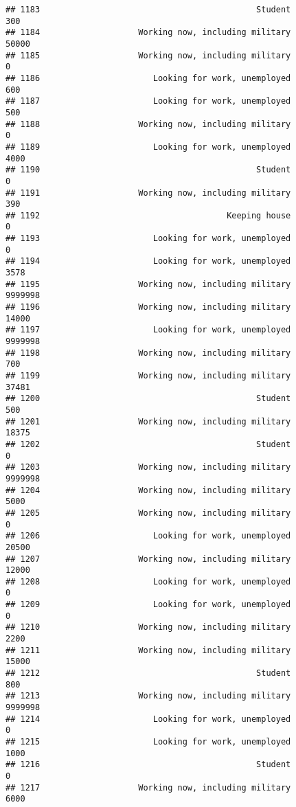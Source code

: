 \documentclass[]{book}
\theoremstyle{definition}
\theoremstyle{definition}
\theoremstyle{remark}
\begin{document}
\begin{verbatim}
## 1183                                            Student             300
## 1184                    Working now, including military           50000
## 1185                    Working now, including military               0
## 1186                       Looking for work, unemployed             600
## 1187                       Looking for work, unemployed             500
## 1188                    Working now, including military               0
## 1189                       Looking for work, unemployed            4000
## 1190                                            Student               0
## 1191                    Working now, including military             390
## 1192                                      Keeping house               0
## 1193                       Looking for work, unemployed               0
## 1194                       Looking for work, unemployed            3578
## 1195                    Working now, including military         9999998
## 1196                    Working now, including military           14000
## 1197                       Looking for work, unemployed         9999998
## 1198                    Working now, including military             700
## 1199                    Working now, including military           37481
## 1200                                            Student             500
## 1201                    Working now, including military           18375
## 1202                                            Student               0
## 1203                    Working now, including military         9999998
## 1204                    Working now, including military            5000
## 1205                    Working now, including military               0
## 1206                       Looking for work, unemployed           20500
## 1207                    Working now, including military           12000
## 1208                       Looking for work, unemployed               0
## 1209                       Looking for work, unemployed               0
## 1210                    Working now, including military            2200
## 1211                    Working now, including military           15000
## 1212                                            Student             800
## 1213                    Working now, including military         9999998
## 1214                       Looking for work, unemployed               0
## 1215                       Looking for work, unemployed            1000
## 1216                                            Student               0
## 1217                    Working now, including military            6000

\end{verbatim}
\end{document}
